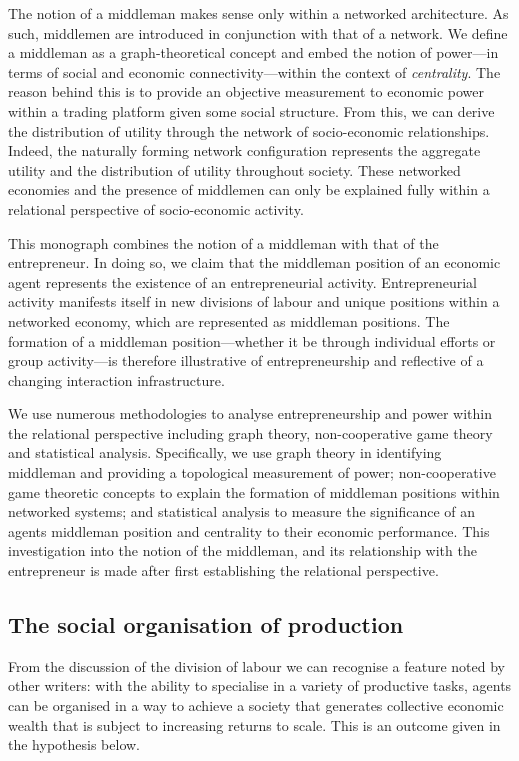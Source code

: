 The notion of a middleman makes sense only within a networked architecture. As such, middlemen are introduced in conjunction with that of a network. We define a middleman as a graph-theoretical concept and embed the notion of power---in terms of social and economic connectivity---within the context of \emph{centrality}. The reason behind this is to provide an objective measurement to economic power within a trading platform given some social structure. From this, we can derive the distribution of utility through the network of socio-economic relationships. Indeed, the naturally forming network configuration represents the aggregate utility and the distribution of utility throughout society. These networked economies and the presence of middlemen can only be explained fully within a relational perspective of socio-economic activity.

This monograph combines the notion of a middleman with that of the entrepreneur. In doing so, we claim that the middleman position of an economic agent represents the existence of an entrepreneurial activity. Entrepreneurial activity manifests itself in new divisions of labour and unique positions within a networked economy, which are represented as middleman positions. The formation of a middleman position---whether it be through individual efforts or group activity---is therefore illustrative of entrepreneurship and reflective of a changing interaction infrastructure.

We use numerous methodologies to analyse entrepreneurship and power within the relational perspective including graph theory, non-cooperative game theory and statistical analysis. Specifically, we use graph theory in identifying middleman and providing a topological measurement of power; non-cooperative game theoretic concepts to explain the formation of middleman positions within networked systems; and statistical analysis to measure the significance of an agents middleman position and centrality to their economic performance. This investigation into the notion of the middleman, and its relationship with the entrepreneur is made after first establishing the relational perspective.

\subsection{The social organisation of production}

From the discussion of the division of labour we can recognise a feature noted by other writers: with the ability to specialise in a variety of productive tasks, agents can be organised in a way to achieve a society that generates collective economic wealth that is subject to increasing returns to scale. This is an outcome given in the hypothesis below.

